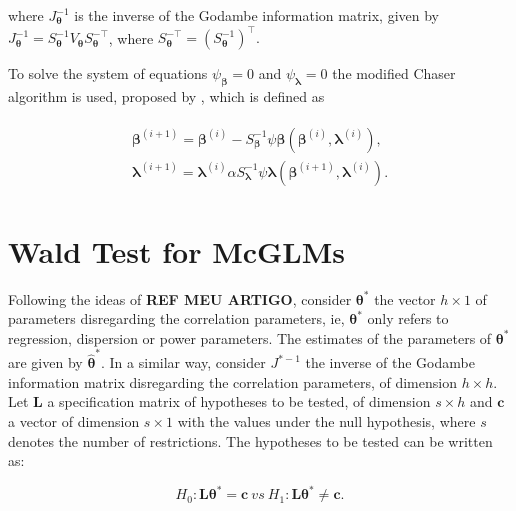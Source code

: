 \documentclass[article]{jss}\usepackage[]{graphicx}\usepackage[]{xcolor}
\begin{document}
\noindent where $J_{\boldsymbol{\theta}}^{-1}$ is the inverse of the Godambe information matrix, given by $J_{\boldsymbol{\theta}}^{-1} = S_{\boldsymbol{\theta}}^{-1} V_{\boldsymbol{\theta}} S_{\boldsymbol{\theta}}^{-\top}$, where $S_{\boldsymbol{\theta}}^{-\top} = (S_{\boldsymbol{\theta}}^{-1})^{\top}.$

To solve the system of equations $\psi_{\boldsymbol{\beta}} = 0$ and $\psi_{\boldsymbol{\lambda}} = 0$ the modified Chaser algorithm is used, proposed by \citet{jorg04}, which is defined as

$$
\begin{aligned}
\begin{matrix}
\boldsymbol{\beta}^{(i+1)} = \boldsymbol{\beta}^{(i)}- S_{\boldsymbol{\beta}}^{-1} \psi \boldsymbol{\beta} (\boldsymbol{\beta}^{(i)}, \boldsymbol{\lambda}^{(i)}), \\ 
\boldsymbol{\lambda}^{(i+1)} = \boldsymbol{\lambda}^{(i)}\alpha S_{\boldsymbol{\lambda}}^{-1} \psi \boldsymbol{\lambda} (\boldsymbol{\beta}^{(i+1)}, \boldsymbol{\lambda}^{(i)}).
\end{matrix}
\end{aligned}
$$


\section{Wald Test for McGLMs}\label{sec:wald}

Following the ideas of \textbf{REF MEU ARTIGO}, consider $\boldsymbol{\theta^{*}}$ the vector $h \times 1$ of parameters disregarding the correlation parameters, ie, $\boldsymbol{\theta^{*}}$ only refers to regression, dispersion or power parameters. The estimates of the parameters of $\boldsymbol{\theta^{*}}$ are given by $\boldsymbol{\hat\theta^{*}}$. In a similar way, consider $J^{\boldsymbol{*}-1}$ the inverse of the Godambe information matrix disregarding the correlation parameters, of dimension $h \times h$. Let $\boldsymbol{L}$ a specification matrix of hypotheses to be tested, of dimension $s \times h$ and $\boldsymbol{c}$ a vector of dimension $s \times 1$ with the values under the null hypothesis, where $s$ denotes the number of restrictions. The hypotheses to be tested can be written as:

\begin{equation}
\label{eq:hipoteses_wald}
H_0: \boldsymbol{L}\boldsymbol{\theta^{*}} = \boldsymbol{c} \ vs \ H_1: \boldsymbol{L}\boldsymbol{\theta^{*}} \neq \boldsymbol{c}. 
\end{equation}
\end{document}
